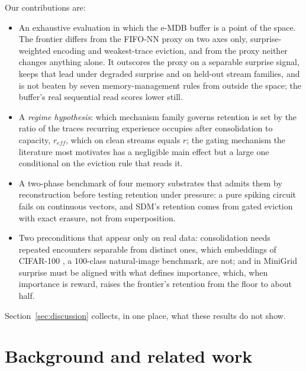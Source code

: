 \documentclass[conference]{IEEEtran}
\begin{document}
Our contributions are:
\begin{itemize}
  \item An exhaustive evaluation in which the e-MDB buffer is a point of the
  space. The frontier differs from the FIFO-NN proxy on two axes only,
  surprise-weighted encoding and weakest-trace eviction, and from the proxy
  neither changes anything alone. It outscores the proxy on a separable
  surprise signal, keeps that lead under degraded surprise and on held-out
  stream families, and is not beaten by seven memory-management rules from
  outside the space; the buffer's real sequential read scores lower still.
  \item A \emph{regime hypothesis}: which mechanism family governs retention is
  set by the ratio of the traces recurring experience occupies after
  consolidation to capacity, $r_{eff}$, which on clean streams equals $r$; the
  gating mechanism the literature most motivates has a negligible main effect
  but a large one conditional on the eviction rule that reads it.
  \item A two-phase benchmark of four memory substrates that admits them by
  reconstruction before testing retention under pressure: a pure spiking
  circuit fails on continuous vectors, and SDM's retention comes from gated
  eviction with exact erasure, not from superposition.
  \item Two preconditions that appear only on real data: consolidation needs
  repeated encounters separable from distinct ones, which embeddings of
  CIFAR-100 \cite{krizhevsky2009}, a 100-class natural-image benchmark, are not; and in MiniGrid \cite{minigrid}
  surprise must be aligned with what defines importance, which, when importance
  is reward, raises the frontier's retention from the floor to about half.
\end{itemize}
Section~\ref{sec:discussion} collects, in one place, what these results do
not show.

\section{Background and related work}
\label{sec:related}
\end{document}
